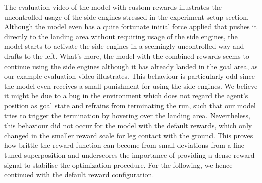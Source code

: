 \documentclass[a4paper, 11pt]{article}
\begin{document}
	The evaluation video of the model with custom rewards illustrates the uncontrolled usage of the side engines stressed in the experiment setup section. Although the model even has a quite fortunate initial force applied that pushes it directly to the landing area without requiring usage of the side engines, the model starts to activate the side engines in a seemingly uncontrolled way and drafts to the left.
	What's more, the model with the combined rewards seems to continue using the side engines although it has already landed in the goal area, as our example evaluation video illustrates. This behaviour is particularly odd since the model even receives a small punishment for using the side engines. We believe it might be due to a bug in the environment which does not regard the agent's position as goal state and refrains from terminating the run, such that our model tries to trigger the termination by hovering over the landing area.
	Nevertheless, this behaviour did not occur for the model with the default rewards, which only changed in the smaller reward scale for leg contact with the ground.
	This proves how brittle the reward function can become from small deviations from a fine-tuned superposition and underscores the importance of providing a dense reward signal to stabilise the optimization procedure.
	For the following, we hence continued with the default reward configuration.
	
\end{document}
